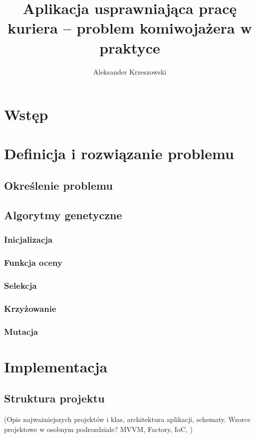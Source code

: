 \documentclass[12pt,a4paper]{report}
\begin{document}
	\author{Aleksander Krzeszowski}
	\title{Aplikacja usprawniająca pracę kuriera -- problem komiwojażera w praktyce}
	
	
	
	\tableofcontents
	
	\chapter*{Wstęp}
		
	\chapter{Definicja i rozwiązanie problemu}
		\label{ch:definicja_i_rozwiazanie}
		\section{Określenie problemu}
			
		\section{Algorytmy genetyczne}
			
		\subsection{Inicjalizacja}
			
		\subsection{Funkcja oceny}
			
		\subsection{Selekcja}
			
		\subsection{Krzyżowanie}
			
		\subsection{Mutacja}
			
	\chapter{Implementacja}
		\section{Struktura projektu}
			(Opis najważniejszych projektów i klas, architektura aplikacji, schematy. Wzorce projektowe w osobnym podrozdziale? MVVM, Factory, IoC, )
			
\end{document}
